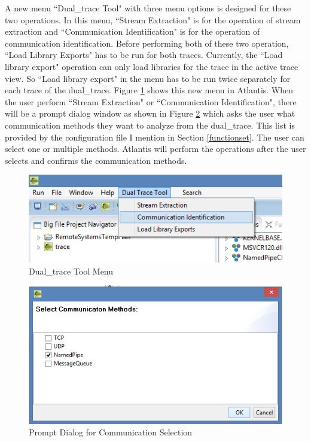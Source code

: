 A new menu ``Dual\_trace Tool" with three menu options is designed for these two operations. In this menu, ``Stream Extraction" is for the operation of stream extraction and ``Communication Identification" is for the operation of communication identification. Before performing both of these two operation, ``Load Library Exports" has to be run for both traces. Currently, the ``Load library export"  operation can only load libraries for the trace in the active trace view. So ``Load library export"  in the menu has to be run twice separately for each trace of the dual\_trace.  Figure \ref{dualtracetoolmenu} shows this new menu in Atlantis. When the user perform ``Stream Extraction" or ``Communication Identification", there will be a prompt dialog window as shown in Figure \ref{methods} which asks the user what communication methods they want to analyze from the dual\_trace. This list is provided by the configuration file I mention in Section \ref{functionset}. The user can select one or multiple methods. Atlantis will perform the operations after the user selects and confirms the communication methods.

\begin{figure}[H]
\centerline{\includegraphics{Figures/dualtracetoolmenu}}
 \caption{Dual\_trace Tool Menu}
\label{dualtracetoolmenu}
\end{figure}

\begin{figure}[H]
\centerline{\includegraphics[scale=0.8]{Figures/methods}}
 \caption{Prompt Dialog for Communication Selection}
\label{methods}
\end{figure}

